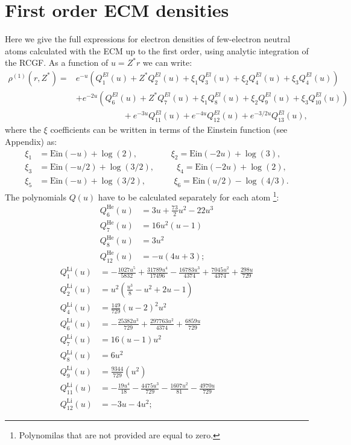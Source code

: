 \newpage

\section{First order ECM densities}

Here we give the full expressions for electron densities of few-electron neutral atoms calculated with the ECM up to the first order, using analytic integration of the RCGF. As a function of $u=Z^* r$ we can write:
\begin{align}
\rho^{(1)}(r,Z^*) =& e^{-u}\left(Q_1^{El}(u)+Z^*Q_2^{El}(u)+\xi_1Q_3^{El}(u)+\xi_2Q_4^{El}(u)+\xi_3Q_4^{El}(u)\right) \nonumber
    \\
    &+e^{-2u}\left(Q_6^{El}(u)+Z^*Q_7^{El}(u)+\xi_1Q_8^{El}(u)+\xi_2Q_9^{El}(u)+\xi_3Q_{10}^{El}(u)\right)\nonumber
    \\
    &\mspace{100mu}+e^{-3u}Q_{11}^{El}(u)+e^{-4u}Q_{12}^{El}(u) +e^{-3/2u}Q_{13}^{El}(u),
\end{align}
where the $\xi$ coefficients can be written in terms of the Einstein function (see Appendix) as:
\begin{align*}
\xi_1 &= \text{Ein}(-u)+\log(2),~~~~~~~~~~~~~~~~~~\xi_2 = \text{Ein}(-2u)+\log(3), \\
\xi_3 &= \text{Ein}(-u/2)+\log(3/2),~~~~~~~~~~~~\xi_4 = \text{Ein}(-2u)+\log(2), \\
\xi_5 &= \text{Ein}(-u)+\log(3/2),~~~~~~~~~~~~~~~\xi_6 = \text{Ein}(u/2)-\log(4/3).
\end{align*}
The polynomials $Q(u)$ have to be calculated separately for each atom \footnote{Polynomilas that are not provided are equal to zero.}:
\begin{subequations}
\begin{align}
Q_6^{\text{He}}(u)  &= 3u+\frac{73}{2}u^2-22u^3\\
Q_7^{\text{He}}(u)  &=  16u^2(u-1)\\
Q_8^{\text{He}}(u)  &=  3u^2\\
Q_{12}^{\text{He}}(u)  &=  -u(4u+3);
\end{align}
\end{subequations}
\begin{subequations}
\begin{align}
Q_1^{\text{Li}}(u)  &= -\frac{1027 u^5}{5832}+\frac{31789 u^4}{17496}-\frac{16783 u^3}{4374}+\frac{7045 u^2}{4374}+\frac{298 u}{729}\\
Q_2^{\text{Li}}(u)  &= u^2 \left(\frac{u^3}{8}-u^2+2 u-1\right)\\
Q_4^{\text{Li}}(u)  &= \frac{149}{729} (u-2)^2 u^2\\
Q_6^{\text{Li}}(u)  &=  -\frac{25382 u^3}{729}+\frac{297763 u^2}{4374}+\frac{6859 u}{729}\\
Q_{7}^{\text{Li}}(u)  &= 16 (u-1) u^2 \\
Q_{8}^{\text{Li}}(u)  &= 6 u^2 \\
Q_{9}^{\text{Li}}(u) & = \frac{9344}{729} (u^2) \\
Q_{11}^{\text{Li}}(u) & = -\frac{19 u^4}{18}-\frac{4475 u^3}{729}-\frac{1607 u^2}{81}-\frac{4970 u}{729} \\
Q_{12}^{\text{Li}}(u) & = -3u-4u^2;
\end{align}
\end{subequations}
